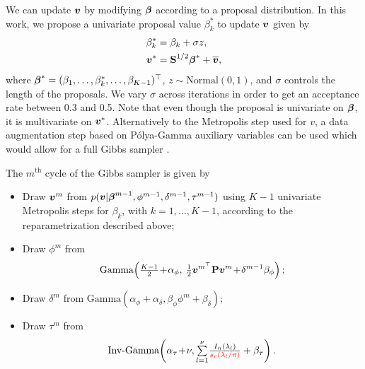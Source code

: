 \documentclass[twocolumn,final]{svjour3}
\newcommand{\bm}[1]{\mbox{\boldmath $#1$}}
\newcommand{\pmr}{ \color{red}}
\begin{document}
We can update $\bm{v}$ by modifying $\bm{\beta}$ according to a proposal distribution.  In this work, we propose a univariate proposal value $\beta_{k}^{*}$ to update $\bm{v}$ given by
\begin{align*}
\beta_{k}^{*} &= \beta_{k} + \sigma z,\\
\bm{v}^{*} &= \textbf{S}^{1/2}\bm{\beta}^{*} + \overline{\bm{v}}, 
\end{align*}
where $\bm{\beta}^{*}= (\beta_1, \dots, \beta_{k}^{*} ,\dots, \beta_{K-1})^\top$, $z \sim \text{Normal}(0,1)$, and $\sigma$ controls the length of the proposals.  We vary $\sigma$ across iterations in order to get an acceptance rate between 0.3 and 0.5.  Note that even though the proposal is univariate on $\bm{\beta}$, it is multivariate on $\bm{v}^*$.
Alternatively to the Metropolis step used for \bm{v}, a data augmentation step based on P\'olya-Gamma auxiliary variables can be used which would allow for a full Gibbs sampler \citep{Polson:2013}. 

The $m^{\text{th}}$ cycle of the Gibbs sampler is given by
\begin{itemize}
	\item Draw $\bm{v}^{m}$ from $p(\bm{v}|\bm{\beta}^{m-1},\phi^{m-1},\delta^{m-1},\tau^{m-1})$ using $K-1$ univariate Metropolis steps for $\beta_k$, with $k=1,\dots,K-1$, according to the reparametrization described above;
	\item Draw $\phi^{m}$ from 
	\begin{align*}
	\text{Gamma}\!\left(\tfrac{K-1}{2}\!+\!\alpha_{\phi},\: \tfrac{1}{2} \bm{v}^{m^\top} \textbf{P} \bm{v}^{m}\!+\!\delta^{m-1} \beta_{\phi} \right);
	\end{align*}
	
	\item Draw $\delta^{m}$ from $\text{Gamma}\left(\alpha_{\phi} + \alpha_{\delta}, \beta_{\phi} \phi^{m} + \beta_{\delta}\right);$ 
	\item Draw $\tau^{m}$ from 
	\begin{align*}
	\text{Inv-Gamma}\!\left(\alpha_{\tau}\!+\!\nu, {\textstyle\sum\limits_{l=1}^{\nu}} \tfrac{I_n(\lambda_l)}{{\pmr s_r(\lambda_l/\pi)}} + \beta_{\tau} \right) .
	\end{align*}
\end{itemize}
\end{document}
